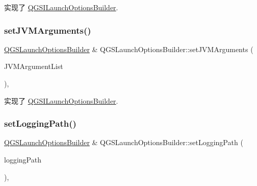 实现了 \mbox{\hyperlink{class_q_g_s_i_launch_options_builder_a4739acc4ebefaac2e41a9ee7264913a1}{Q\+G\+S\+I\+Launch\+Options\+Builder}}.

\mbox{\label{class_q_g_s_launch_options_builder_a6db06aa915c13411c202e404acb5dd9f}} 
\subsubsection{\texorpdfstring{set\+J\+V\+M\+Arguments()}{setJVMArguments()}\hspace{0.1cm}{\footnotesize\ttfamily [2/2]}}
{\footnotesize\ttfamily \mbox{\hyperlink{class_q_g_s_launch_options_builder}{Q\+G\+S\+Launch\+Options\+Builder}} \& Q\+G\+S\+Launch\+Options\+Builder\+::set\+J\+V\+M\+Arguments (\begin{DoxyParamCaption}\item[{const Q\+String\+List \&}]{J\+V\+M\+Argument\+List }\end{DoxyParamCaption})\hspace{0.3cm}{\ttfamily [override]}, {\ttfamily [virtual]}}



实现了 \mbox{\hyperlink{class_q_g_s_i_launch_options_builder_af5a17db86753583d29a0776b05e67387}{Q\+G\+S\+I\+Launch\+Options\+Builder}}.

\mbox{\label{class_q_g_s_launch_options_builder_a5f491bfbe78823ea398af943107cd9f1}} 
\subsubsection{\texorpdfstring{set\+Logging\+Path()}{setLoggingPath()}}
{\footnotesize\ttfamily \mbox{\hyperlink{class_q_g_s_launch_options_builder}{Q\+G\+S\+Launch\+Options\+Builder}} \& Q\+G\+S\+Launch\+Options\+Builder\+::set\+Logging\+Path (\begin{DoxyParamCaption}\item[{const Q\+String \&}]{logging\+Path }\end{DoxyParamCaption})\hspace{0.3cm}{\ttfamily [override]}, {\ttfamily [virtual]}}



